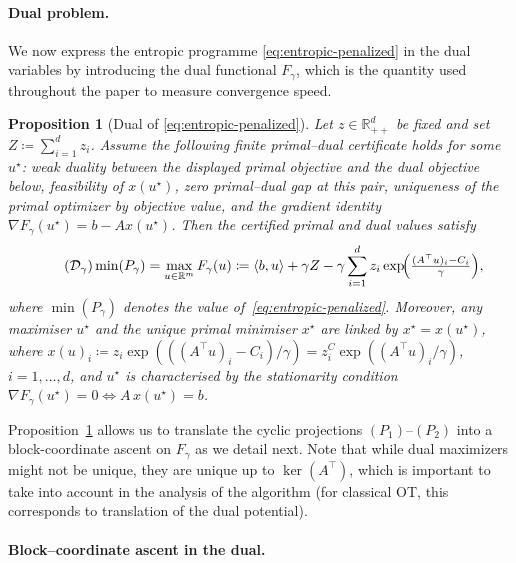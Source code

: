 \documentclass{article}
\theoremstyle{plain}
\newtheorem{proposition}{Proposition}[section]
\newcommand{\RR}{\mathbb{R}}
\newcommand{\z}{z}
\newcommand{\zC}{\z^C}
\begin{document}
\paragraph{Dual problem.}
\label{subsec:primal-dual}
We now express the entropic programme \eqref{eq:entropic-penalized} in the dual variables by introducing the dual functional $F_\gamma$, which is the quantity used throughout the paper to measure convergence speed.

\begin{proposition}[Dual of \eqref{eq:entropic-penalized}]
\label{prop:dual-gamma-correct}
Let $\z\in\RR^d_{++}$ be fixed and set $Z \coloneqq \sum_{i=1}^d \z_i$.
Assume the following finite primal--dual certificate holds for some $u^\star$: weak duality between the displayed primal objective and the dual objective below, feasibility of $x(u^\star)$, zero primal--dual gap at this pair, uniqueness of the primal optimizer by objective value, and the gradient identity
$\nabla F_\gamma(u^\star)=b-Ax(u^\star)$.
Then the certified primal and dual values satisfy
\begin{equation}
\label{eq:dual-regul}\tag{$\mathcal{D}_\gamma$}
  \min(P_\gamma)=\max_{u\in\RR^{m}} F_{\gamma}(u)
  \coloneqq
  \langle b,u\rangle+
  \gamma Z-
  \gamma \sum_{i=1}^d
  \z_i\exp\!\Bigl(\tfrac{(A^\top u)_i-C_i}{\gamma}\Bigr),
\end{equation}
where $\min(P_\gamma)$ denotes the value of~\eqref{eq:entropic-penalized}.
Moreover, any maximiser \(u^\star\) and the unique primal minimiser \(x^\star\) are linked by $x^\star=x(u^\star)$, where $x(u)_i\coloneqq \z_i\exp(((A^\top u)_i-C_i)/\gamma)=\zC_i\exp((A^\top u)_i/\gamma)$, $i=1,\dots,d$, and \(u^\star\) is characterised by the stationarity condition $\nabla F_\gamma(u^\star)=0\Longleftrightarrow A\,x(u^\star)=b$.
\end{proposition}

Proposition~\ref{prop:dual-gamma-correct} allows us to translate the cyclic projections $(P_1)$--$(P_2)$ into a block-coordinate ascent on $F_{\gamma}$ as we detail next. 
%
Note that while dual maximizers might not be unique, they are unique up to $\ker(A^\top)$, which is important to take into account in the analysis of the algorithm (for classical OT, this corresponds to translation of the dual potential).

\paragraph{Block--coordinate ascent in the dual.}
\end{document}

